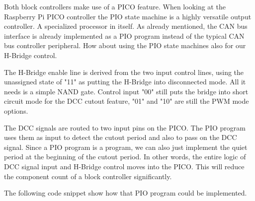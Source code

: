 
Both block controllers make use of a PICO feature. When looking at the Raspberry Pi PICO controller the PIO state machine is a highly versatile output controller. A specialized processor in itself. As already mentioned, the CAN bus interface is already implemented as a PIO program instead of the typical CAN bus controller peripheral. How about using the PIO state machines also for our H-Bridge control. 

The H-Bridge enable line is derived from the two  input control lines, using the unassigned state of "11" as putting the H-Bridge into disconnected mode. All it needs is a simple NAND gate. Control input "00" still puts the bridge into short circuit mode for the DCC cutout feature, "01" and "10" are still the PWM mode options. 

The DCC signals are routed to two input pins on the PICO. The PIO program uses them as input to detect the cutout period and also to pass on the DCC signal. Since a PIO program is a program, we can also just implement the quiet period at the beginning of the cutout period. In other words, the entire logic of DCC signal input and H-Bridge control moves into the PICO. This will reduce the component count of a block controller significantly.

The following code snippet show how that PIO program could be implemented.

